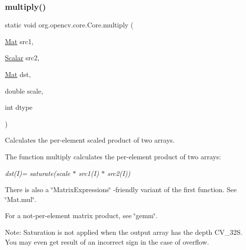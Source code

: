 \subsubsection{\texorpdfstring{multiply()}{multiply()}\hspace{0.1cm}{\footnotesize\ttfamily [4/6]}}
{\footnotesize\ttfamily static void org.\+opencv.\+core.\+Core.\+multiply (\begin{DoxyParamCaption}\item[{\mbox{\hyperlink{classorg_1_1opencv_1_1core_1_1_mat}{Mat}}}]{src1,  }\item[{\mbox{\hyperlink{classorg_1_1opencv_1_1core_1_1_scalar}{Scalar}}}]{src2,  }\item[{\mbox{\hyperlink{classorg_1_1opencv_1_1core_1_1_mat}{Mat}}}]{dst,  }\item[{double}]{scale,  }\item[{int}]{dtype }\end{DoxyParamCaption})\hspace{0.3cm}{\ttfamily [static]}}

Calculates the per-\/element scaled product of two arrays.

The function {\ttfamily multiply} calculates the per-\/element product of two arrays\+:

{\itshape dst(\+I)= saturate(scale $\ast$ src1(\+I) $\ast$ src2(\+I))}

There is also a \char`\"{}\+Matrix\+Expressions\char`\"{} -\/friendly variant of the first function. See \char`\"{}\+Mat.\+mul\char`\"{}.

For a not-\/per-\/element matrix product, see \char`\"{}gemm\char`\"{}.

Note\+: Saturation is not applied when the output array has the depth {\ttfamily C\+V\+\_\+32S}. You may even get result of an incorrect sign in the case of overflow.


